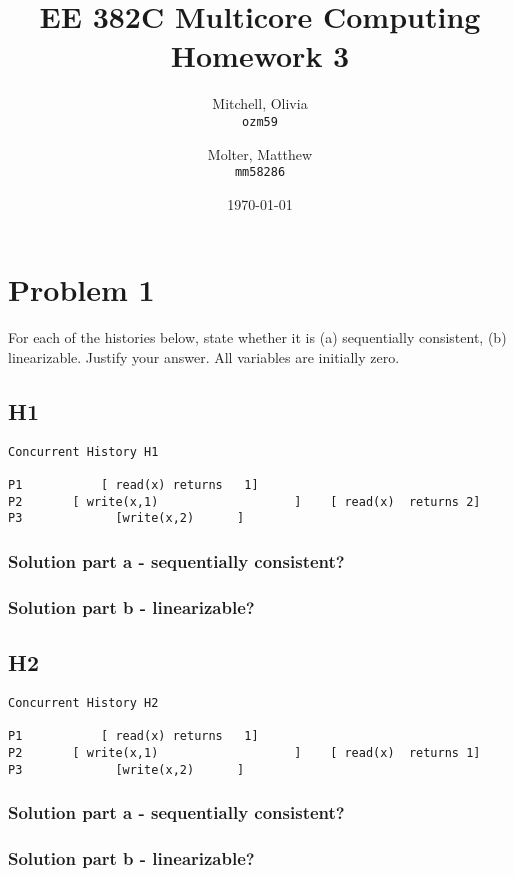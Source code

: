 \documentclass{article}
\title{EE 382C Multicore Computing Homework 3}
\author{
    Mitchell, Olivia\\
    \texttt{ozm59}
    \and
    Molter, Matthew\\
    \texttt{mm58286}}
\date{\today}
\begin{document}
\maketitle

\section{Problem 1}
For each of the histories below, state whether it is
(a) sequentially consistent, (b) linearizable. Justify your answer.
All variables are initially zero.

\subsection{H1}
\begin{verbatim}
Concurrent History H1

P1           [ read(x) returns   1]
P2       [ write(x,1)                   ]    [ read(x)  returns 2]
P3             [write(x,2)      ]            
\end{verbatim}

\subsubsection{Solution part a - sequentially consistent?}
\subsubsection{Solution part b - linearizable?}

\subsection{H2}
\begin{verbatim}
Concurrent History H2

P1           [ read(x) returns   1]
P2       [ write(x,1)                   ]    [ read(x)  returns 1]
P3             [write(x,2)      ]            
\end{verbatim}

\subsubsection{Solution part a - sequentially consistent?}
\subsubsection{Solution part b - linearizable?}
\end{document}
